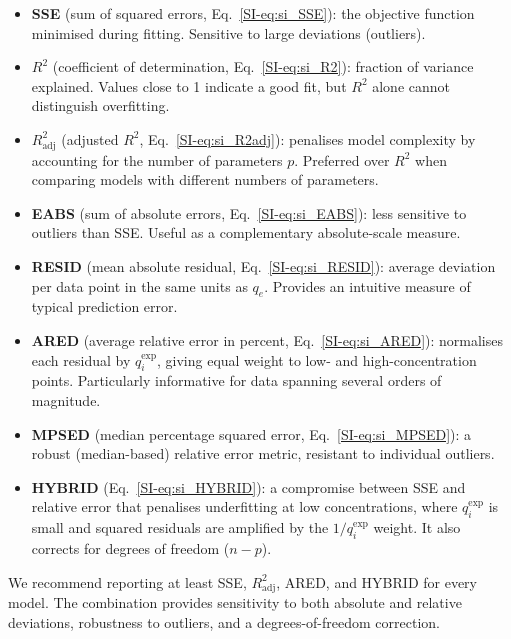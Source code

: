 \documentclass[journal=jacsat,manuscript=article]{achemso}
\begin{document}
	\begin{itemize}
		\item \textbf{SSE} (sum of squared errors, Eq.~\ref{SI-eq:si_SSE}): the objective function minimised during fitting. Sensitive to large deviations (outliers).
		\item \textbf{$R^2$} (coefficient of determination, Eq.~\ref{SI-eq:si_R2}): fraction of variance explained. Values close to 1 indicate a good fit, but $R^2$ alone cannot distinguish overfitting.
		\item \textbf{$R^2_{\mathrm{adj}}$} (adjusted $R^2$, Eq.~\ref{SI-eq:si_R2adj}): penalises model complexity by accounting for the number of parameters $p$. Preferred over $R^2$ when comparing models with different numbers of parameters.
		\item \textbf{EABS} (sum of absolute errors, Eq.~\ref{SI-eq:si_EABS}): less sensitive to outliers than SSE. Useful as a complementary absolute-scale measure.
		\item \textbf{RESID} (mean absolute residual, Eq.~\ref{SI-eq:si_RESID}): average deviation per data point in the same units as $q_e$. Provides an intuitive measure of typical prediction error.
		\item \textbf{ARED} (average relative error in percent, Eq.~\ref{SI-eq:si_ARED}): normalises each residual by $q_i^{\exp}$, giving equal weight to low- and high-concentration points. Particularly informative for data spanning several orders of magnitude.
		\item \textbf{MPSED} (median percentage squared error, Eq.~\ref{SI-eq:si_MPSED}): a robust (median-based) relative error metric, resistant to individual outliers.
		\item \textbf{HYBRID} (Eq.~\ref{SI-eq:si_HYBRID}): a compromise between SSE and relative error that penalises underfitting at low concentrations, where $q_i^{\exp}$ is small and squared residuals are amplified by the $1/q_i^{\exp}$ weight. It also corrects for degrees of freedom ($n - p$).
	\end{itemize}

	We recommend reporting at least SSE, $R^2_{\mathrm{adj}}$, ARED, and HYBRID for every model. The combination provides sensitivity to both absolute and relative deviations, robustness to outliers, and a degrees-of-freedom correction.
\end{document}
